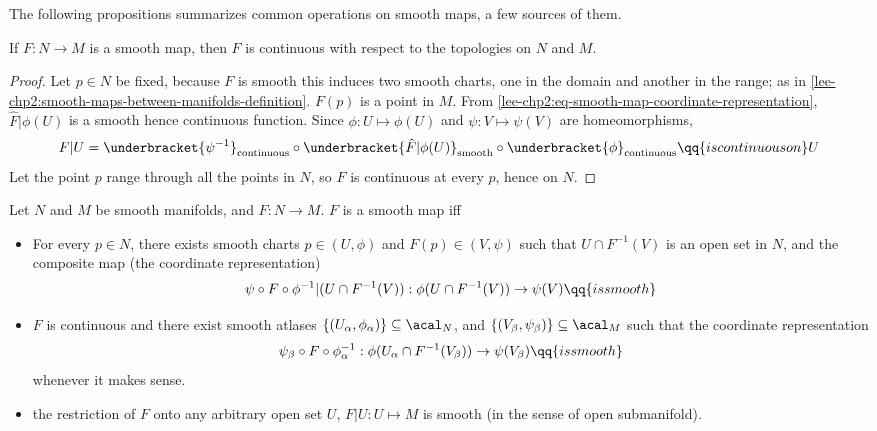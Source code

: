\documentclass[../main-v2-manifolds.tex]{subfiles}
\begin{document}
The following propositions summarizes common operations on smooth maps, a few sources of them.
\begin{wts}\label{lee-chp2:smooth-maps-are-continuous}
    If $F:N\to M$ is a smooth map, then $F$ is continuous with respect to the topologies on $N$ and $M$.
\end{wts}
\begin{proof}
    Let $p\in N$ be fixed, because $F$ is smooth this induces two smooth charts, one in the domain and another in the range; as in \cref{lee-chp2:smooth-maps-between-manifolds-definition}. $F(p)$ is a point in $M$. From \cref{lee-chp2:eq-smooth-map-coordinate-representation}, $\hat{F}|\phi(U)$ is a smooth hence continuous function. Since $\phi: U\mapsto \phi(U)$ and $\psi: V\mapsto \psi(V)$ are homeomorphisms, 
    \[
        F|U = \underbracket{\psi^{-1}}_{\text{continuous}}\circ \underbracket{\hat{F}|\phi(U)}_{\text{smooth}}\circ \underbracket{\phi}_{\text{continuous}}\qq{is continuous on }U
    \]
    Let the point $p$ range through all the points in $N$, so $F$ is continuous at every $p$, hence on $N$.
\end{proof}
\begin{wts}\label{lee-chp2:characterizations-of-smooth-maps}
    Let $N$ and $M$ be smooth manifolds, and $F:N\to M$. $F$ is a smooth map iff
    \begin{itemize}
        \item For every $p\in N$, there exists smooth charts $p\in (U,\phi)$ and $F(p)\in (V,\psi)$ such that $U\cap F^{-1}(V)$ is an open set in $N$, and the composite map (the coordinate representation)
        \[
            \psi\circ F\circ \phi^{-1}|(U\cap F^{-1}(V)):\phi(U\cap F^{-1}(V))\to \psi(V)\qq{is smooth}
        \]
        \item $F$ is continuous and there exist smooth atlases $\{(U_\alpha,\phi_\alpha)\}\subseteq\acal_N$, and $\{(V_\beta,\psi_\beta)\}\subseteq\acal_M$ such that the coordinate representation 
        \[
            \psi_\beta\circ F\circ \phi_\alpha^{-1}:\phi(U_\alpha\cap F^{-1}(V_\beta))\to \psi(V_\beta)\qq{is smooth}
        \]
        whenever it makes sense.
        \item the restriction of $F$ onto any arbitrary open set $U$, $F|U: U\mapsto M$ is smooth (in the sense of open submanifold).
    \end{itemize}
\end{wts}
\end{document}
